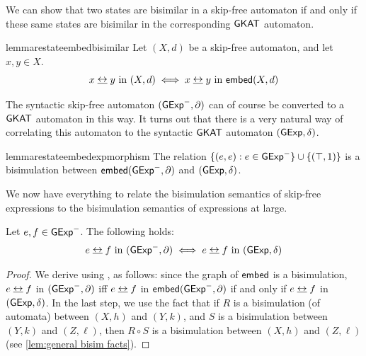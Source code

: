 \documentclass[orivec,envcountsect,envcountsame]{llncs}
\begin{document}
We can show that two states are bisimilar in a skip-free automaton if and only if these same states are bisimilar in the corresponding $\textsf{GKAT}$ automaton.

\begin{restatable}{lemma}{restateembedbisimilar}%
\label{lemma:embed-bisimilar}
Let $(X, d)$ be a skip-free automaton, and let $x, y \in X$.
\[
    x \bisim y~\text{in}~(X, d) \iff x \bisim y~\text{in}~\embed(X, d)
\]
\end{restatable}

The syntactic skip-free automaton $(\mathsf{GExp}^-, \partial)$ can of course be converted to a $\textsf{GKAT}$ automaton in this way.
It turns out that there is a very natural way of correlating this automaton to the syntactic $\textsf{GKAT}$ automaton $(\mathsf{GExp}, \delta)$.

\begin{restatable}{lemma}{restateembedexpmorphism}%
\label{lemma:embed-exp-morphism}
The relation $\{ (e, e) : e \in \mathsf{GExp}^- \} \cup \{ (\top, 1) \}$ is a bisimulation between $\mathsf{embed}(\mathsf{GExp}^-, \partial)$ and $(\mathsf{GExp}, \delta)$.
\end{restatable}

We now have everything to relate the bisimulation semantics of skip-free \GKAT expressions to the bisimulation semantics of \GKAT expressions at large.

\begin{lemma}%
\label{lemma:relate-bisim-semantics}
Let $e, f \in \mathsf{GExp}^-$.
The following holds:
\[
    e \bisim f~\text{in}~(\GExp^-, \partial)
    \iff
    e \bisim  f~\text{in}~(\GExp, \delta)
\]
\end{lemma}
\begin{proof}
We derive using , as follows: since the graph of \(\mathsf{embed}\) is a bisimulation, \(e \bisim f\) in \((\mathsf{GExp}^-, \partial)\) iff \(e \bisim f\) in \(\mathsf{embed}(\mathsf{GExp}^-, \partial)\) if and only if \(e \bisim f\) in \((\mathsf{GExp}, \delta)\).
In the last step, we use the fact that if $R$ is a bisimulation (of automata) between $(X, h)$ and $(Y, k)$, and $S$ is a bisimulation between $(Y, k)$ and $(Z, \ell)$, then $R \circ S$ is a bisimulation between $(X, h)$ and $(Z, \ell)$ (see \cref{lem:general bisim facts}).
\end{proof}
\end{document}
